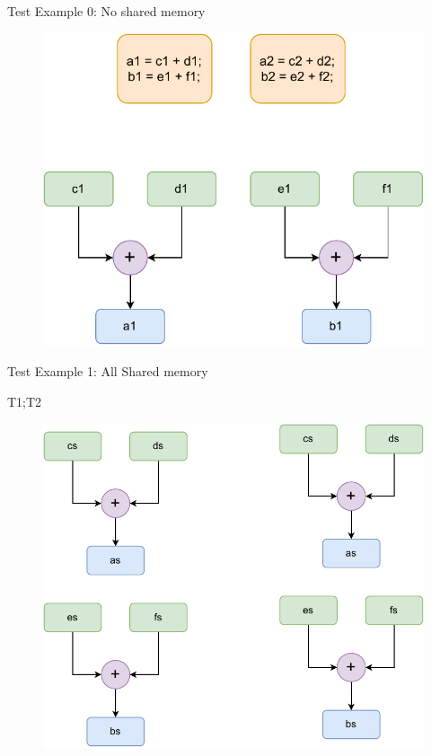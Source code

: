 \documentclass[notes, xcolor=dvipsnames]{beamer}
\begin{document}
    \begin{frame}{Test Example 0: No shared memory}
        
        \begin{figure}
            \includegraphics[scale=0.4]{NoSharedEx.pdf}
        \end{figure}

    \end{frame}

    \begin{frame}{Test Example 1: All Shared memory }

        T1;T2
        \begin{figure}
            \includegraphics[scale=0.4]{AllSharedMerge.pdf}
        \end{figure}

    \end{frame}
\end{document}
